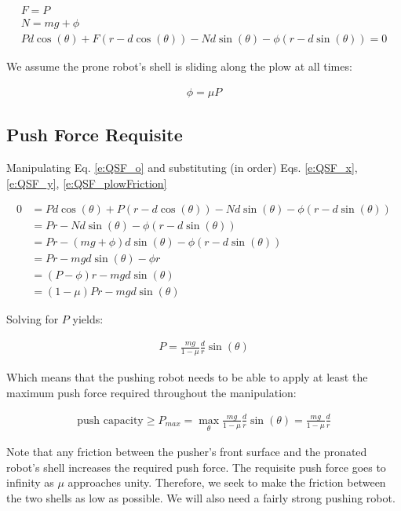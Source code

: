 \documentclass[letterpaper]{report}
\begin{document}
\begin{align}
  F = P \label{e:QSF_x} \\
  N = mg + \phi \label{e:QSF_y} \\
  P d \cos(\theta) + F(r - d \cos(\theta)) - N d \sin(\theta) - \phi (r - d \sin(\theta)) = 0 \label{e:QSF_o}
\end{align}

We assume the prone robot's shell is sliding along the plow at all times:

\begin{align}
  \phi = \mu P \label{e:QSF_plowFriction}
\end{align}

\subsection{Push Force Requisite}
Manipulating Eq. \ref{e:QSF_o} and substituting (in order) Eqs. \ref{e:QSF_x}, \ref{e:QSF_y}, \ref{e:QSF_plowFriction}

\begin{align}
  0 &= P d \cos(\theta) + P(r - d \cos(\theta)) - N d \sin(\theta) - \phi (r - d \sin(\theta))
  \\&= Pr - N d \sin(\theta) - \phi (r - d \sin(\theta))
  \\&= Pr - (mg + \phi) d \sin(\theta) - \phi (r - d \sin(\theta))
  \\&= Pr - mg d \sin(\theta) - \phi r
  \\&= (P - \phi)r - mg d \sin(\theta)
  \\&= (1-\mu) P r - mg d \sin(\theta)
\end{align}

Solving for $P$ yields:

\begin{align}
  P = \frac{mg}{1-\mu} \frac{d}{r} \sin(\theta)
\end{align}

Which means that the pushing robot needs to be able to apply at least the maximum push force required throughout the manipulation:

\begin{align}
  \text{push capacity} \geq P_{max} = \max_\theta \frac{mg}{1-\mu} \frac{d}{r} \sin(\theta) = \frac{mg}{1-\mu} \frac{d}{r}
\end{align}

Note that any friction between the pusher's front surface and the pronated robot's shell increases the required push force.
The requisite push force goes to infinity as $\mu$ approaches unity.
Therefore, we seek to make the friction between the two shells as low as possible.
We will also need a fairly strong pushing robot.
\end{document}
